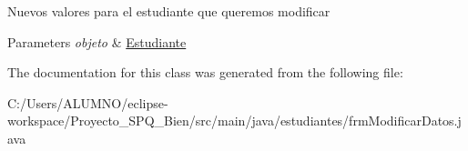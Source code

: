 Nuevos valores para el estudiante que queremos modificar


\begin{DoxyParams}{Parameters}
{\em objeto} & \hyperlink{classestudiantes_1_1_estudiante}{Estudiante} \\
\hline
\end{DoxyParams}


The documentation for this class was generated from the following file\+:\begin{DoxyCompactItemize}
\item 
C\+:/\+Users/\+A\+L\+U\+M\+N\+O/eclipse-\/workspace/\+Proyecto\+\_\+\+S\+P\+Q\+\_\+Bien/src/main/java/estudiantes/frm\+Modificar\+Datos.\+java\end{DoxyCompactItemize}

